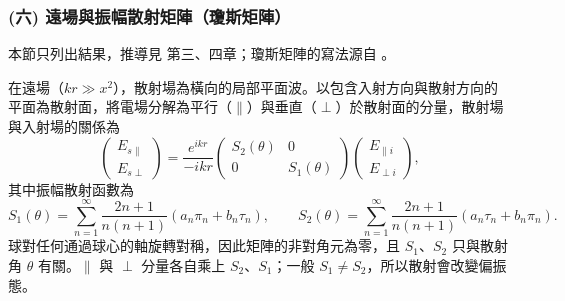 
\subsubsection*{(六) 遠場與振幅散射矩陣（瓊斯矩陣）}
本節只列出結果，推導見 \textcite{bohren1983Absorption} 第三、四章；瓊斯矩陣的寫法源自 \textcite{jones1941NewCalculus}。

在遠場（$kr \gg x^2$），散射場為橫向的局部平面波。以包含入射方向與散射方向的平面為散射面，將電場分解為平行（$\parallel$）與垂直（$\perp$）於散射面的分量，散射場與入射場的關係為
\begin{equation}
    \begin{pmatrix} E_{s\parallel} \\ E_{s\perp} \end{pmatrix} = \frac{e^{ikr}}{-ikr} \begin{pmatrix} S_2(\theta) & 0 \\ 0 & S_1(\theta) \end{pmatrix} \begin{pmatrix} E_{\parallel i} \\ E_{\perp i} \end{pmatrix} , \label{eq:jones}
\end{equation}
其中振幅散射函數為
\begin{equation}
    S_1(\theta) = \sum_{n=1}^{\infty} \frac{2n+1}{n(n+1)} \left( a_n \pi_n + b_n \tau_n \right), \qquad S_2(\theta) = \sum_{n=1}^{\infty} \frac{2n+1}{n(n+1)} \left( a_n \tau_n + b_n \pi_n \right) . \label{eq:S1S2}
\end{equation}
球對任何通過球心的軸旋轉對稱，因此矩陣的非對角元為零，且 $S_1$、$S_2$ 只與散射角 $\theta$ 有關。$\parallel$ 與 $\perp$ 分量各自乘上 $S_2$、$S_1$；一般 $S_1 \neq S_2$，所以散射會改變偏振態。

